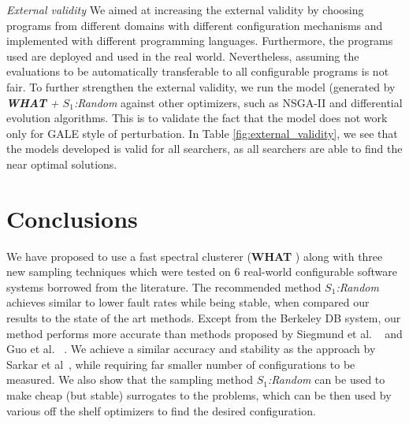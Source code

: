 \documentclass{sig-alternative}
\newcommand{\what}{{\bf WHAT }}
\begin{document}
{\em External validity}  We aimed at increasing the external validity by choosing programs from different domains with different configuration mechanisms and implemented with different programming languages. Furthermore, the programs used are deployed and used in the real world. Nevertheless, assuming the evaluations to be automatically transferable  to all configurable programs is not fair. To further strengthen the external validity, we run the model (generated by \textit{\what + $S_1$:Random} against other optimizers, such as NSGA-II and differential evolution algorithms\cite{storn1997differential}. This is to validate the fact that the model does not work only for GALE style of perturbation. In Table \ref{fig:external_validity}, we see that the models developed is valid for all searchers, as all searchers are able to find the near optimal solutions.







\section{Conclusions}

We have proposed to use a fast spectral clusterer (\what) along with three new sampling techniques which were tested on 6 real-world configurable software systems borrowed from the literature. The recommended method \textit{$S_1$:Random} achieves similar to lower fault rates while being stable, when compared our results to the state of the art methods. 
Except from the Berkeley DB system, our method performs more accurate than methods proposed by Siegmund et al.  ~\cite{siegmund2012predicting} and Guo et al. ~\cite{guo2013variability}. We achieve a similar accuracy and stability as the approach by Sarkar et al~\cite{sarkar2015cost}, while requiring far smaller number of configurations to be measured. We also show that the sampling method \textit{$S_1$:Random} can be used to make cheap (but stable) surrogates to the problems, which can be then used by various off the shelf optimizers to find the desired configuration. 
\end{document}
